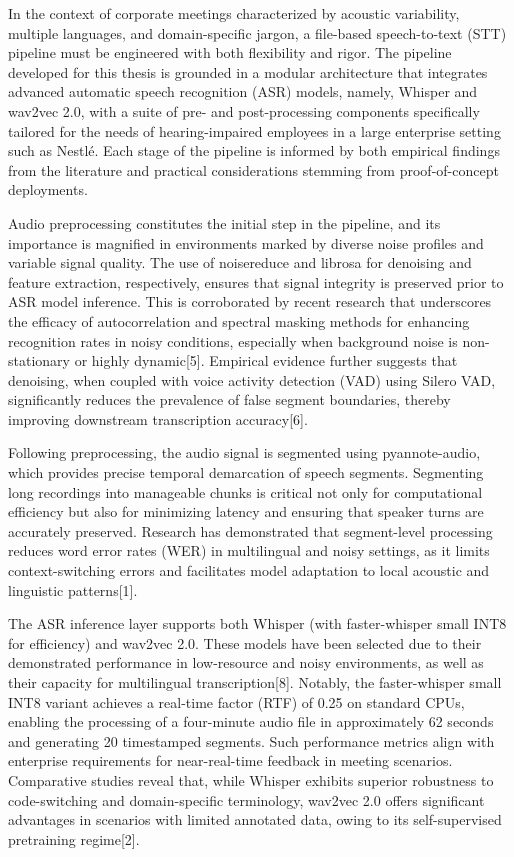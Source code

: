 \documentclass[12pt,a4paper]{article}
\begin{document}
In the context of corporate meetings characterized by acoustic variability, multiple languages, and domain-specific jargon, a file-based speech-to-text (STT) pipeline must be engineered with both flexibility and rigor. The pipeline developed for this thesis is grounded in a modular architecture that integrates advanced automatic speech recognition (ASR) models, namely, Whisper and wav2vec 2.0, with a suite of pre- and post-processing components specifically tailored for the needs of hearing-impaired employees in a large enterprise setting such as Nestlé. Each stage of the pipeline is informed by both empirical findings from the literature and practical considerations stemming from proof-of-concept deployments.


Audio preprocessing constitutes the initial step in the pipeline, and its importance is magnified in environments marked by diverse noise profiles and variable signal quality. The use of noisereduce and librosa for denoising and feature extraction, respectively, ensures that signal integrity is preserved prior to ASR model inference. This is corroborated by recent research that underscores the efficacy of autocorrelation and spectral masking methods for enhancing recognition rates in noisy conditions, especially when background noise is non-stationary or highly dynamic[5]. Empirical evidence further suggests that denoising, when coupled with voice activity detection (VAD) using Silero VAD, significantly reduces the prevalence of false segment boundaries, thereby improving downstream transcription accuracy[6].


Following preprocessing, the audio signal is segmented using pyannote-audio, which provides precise temporal demarcation of speech segments. Segmenting long recordings into manageable chunks is critical not only for computational efficiency but also for minimizing latency and ensuring that speaker turns are accurately preserved. Research has demonstrated that segment-level processing reduces word error rates (WER) in multilingual and noisy settings, as it limits context-switching errors and facilitates model adaptation to local acoustic and linguistic patterns[1].


The ASR inference layer supports both Whisper (with faster-whisper small INT8 for efficiency) and wav2vec 2.0. These models have been selected due to their demonstrated performance in low-resource and noisy environments, as well as their capacity for multilingual transcription[8]. Notably, the faster-whisper small INT8 variant achieves a real-time factor (RTF) of 0.25 on standard CPUs, enabling the processing of a four-minute audio file in approximately 62 seconds and generating 20 timestamped segments. Such performance metrics align with enterprise requirements for near-real-time feedback in meeting scenarios. Comparative studies reveal that, while Whisper exhibits superior robustness to code-switching and domain-specific terminology, wav2vec 2.0 offers significant advantages in scenarios with limited annotated data, owing to its self-supervised pretraining regime[2].
\end{document}
